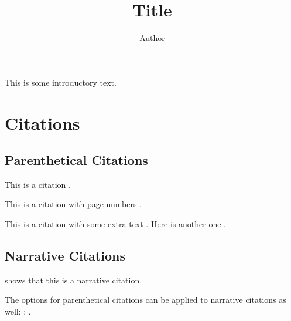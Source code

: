 \documentclass[stu,12pt,a4paper,biblatex,floatsintext]{apa7}
\title{Title}
\author{Author}
\affiliation{Affiliation}
\begin{document}
\maketitle

This is some introductory text.

\section{Citations}

\subsection{Parenthetical Citations}

This is a citation \parencite{example1970}.

This is a citation with page numbers \parencite[1-2]{example1970}.

This is a citation with some extra text \parencite[Appendix A]{example1970}. Here is another one \parencite[ch. 1 p. 1]{example1970}.

\subsection{Narrative Citations}

\textcite{example1970} shows that this is a narrative citation.

The options for parenthetical citations can be applied to narrative citations as well: \textcite[1-2]{example1970}; \textcite[Appendix A]{example1970}.

\printbibliography
\end{document}
